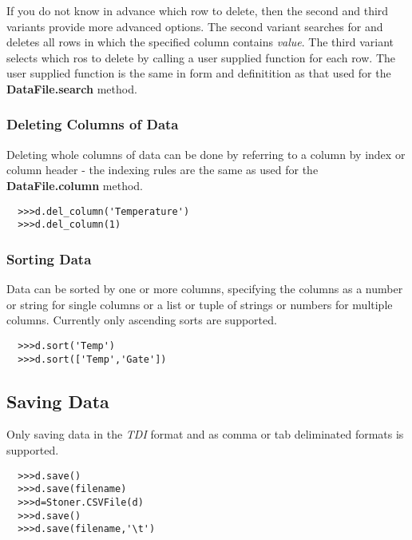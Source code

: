 \documentclass[a4paper,11pt]{scrartcl}
\begin{document}
If you do not know in advance which row to delete, then the second and third
variants provide more advanced options. The second variant searches for and
deletes all rows in which the specified column contains \textit{value}. The
third variant selects which ros to delete by calling a user supplied function
for each row. The user supplied function is the same in form and definitition as
that used for the \textbf{DataFile.search} method.

\subsubsection{Deleting Columns of Data}

Deleting whole columns of data can be done by referring to a column by index or
column header - the indexing rules are the same as used for the
\textbf{DataFile.column} method.

\begin{verbatim}
  >>>d.del_column('Temperature')
  >>>d.del_column(1)
\end{verbatim}

\subsubsection{Sorting Data}

Data can be sorted by one or more columns, specifying the columns as a number or
string for single columns or a list or tuple of strings or numbers for multiple
columns. Currently only ascending sorts are supported.

\begin{verbatim}
  >>>d.sort('Temp')
  >>>d.sort(['Temp','Gate'])
\end{verbatim}

\subsection{Saving Data}\label{save}

Only saving data in the \textit{TDI} format and as comma or tab deliminated formats is supported.


\begin{verbatim}
  >>>d.save()
  >>>d.save(filename)
  >>>d=Stoner.CSVFile(d)
  >>>d.save()
  >>>d.save(filename,'\t')
\end{verbatim}
\end{document}

